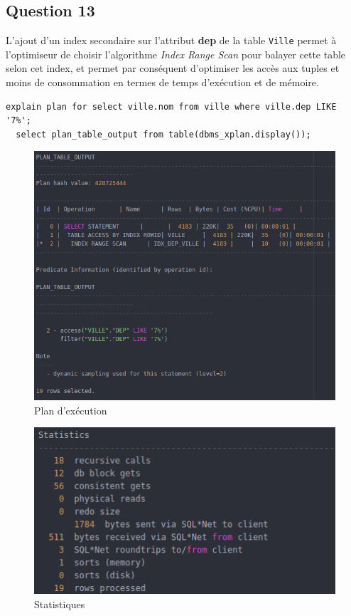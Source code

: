 \documentclass[a4paper,12pt]{article}
\begin{document}
\newpage

\subsection{Question 13}
L'ajout d'un index secondaire sur l'attribut \textbf{dep} de la table \texttt{Ville} permet à l'optimiseur de choisir l'algorithme \textit{Index Range Scan} pour balayer cette table selon cet index, et permet par conséquent d'optimiser les accès aux tuples et moins de consommation en termes de temps d'exécution et de mémoire.

\begin{lstlisting}[caption={requêtes permettant d'expliquer le plan d'exécution affichant le nom des villes dont le numéro de département (dep) commence par 7}]
  explain plan for select ville.nom from ville where ville.dep LIKE '7%';
  select plan_table_output from table(dbms_xplan.display());
\end{lstlisting}

\begin{figure}[!ht]
  \centering
  \includegraphics[scale=0.6]{images/q13_1.png}
  \caption{Plan d'exécution}
\end{figure}

\begin{figure}[!ht]
  \centering
  \includegraphics[scale=0.6]{images/q13_2.png}
  \caption{Statistiques}
\end{figure}
\end{document}
